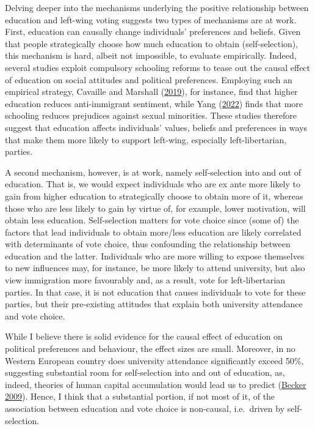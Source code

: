\documentclass[
]{article}
\begin{document}
Delving deeper into the mechanisms underlying the positive relationship
between education and left-wing voting suggests two types of mechanisms
are at work. First, education can causally change individuals'
preferences and beliefs. Given that people strategically choose how much
education to obtain (self-selection), this mechanism is hard, albeit not
impossible, to evaluate empirically. Indeed, several studies exploit
compulsory schooling reforms to tease out the causal effect of education
on social attitudes and political preferences. Employing such an
empirical strategy, Cavaille and Marshall
(\protect\hyperlink{ref-cavaille2019education}{2019}), for instance,
find that higher education reduces anti-immigrant sentiment, while Yang
(\protect\hyperlink{ref-yang2022more}{2022}) finds that more schooling
reduces prejudices against sexual minorities. These studies therefore
suggest that education affects individuals' values, beliefs and
preferences in ways that make them more likely to support left-wing,
especially left-libertarian, parties.

A second mechanism, however, is at work, namely self-selection into and
out of education. That is, we would expect individuals who are ex ante
more likely to gain from higher education to strategically choose to
obtain more of it, whereas those who are less likely to gain by virtue
of, for example, lower motivation, will obtain less education.
Self-selection matters for vote choice since (some of) the factors that
lead individuals to obtain more/less education are likely correlated
with determinants of vote choice, thus confounding the relationship
between education and the latter. Individuals who are more willing to
expose themselves to new influences may, for instance, be more likely to
attend university, but also view immigration more favourably and, as a
result, vote for left-libertarian parties. In that case, it is not
education that causes individuals to vote for these parties, but their
pre-existing attitudes that explain both university attendance and vote
choice.

While I believe there is solid evidence for the causal effect of
education on political preferences and behaviour, the effect sizes are
small. Moreover, in no Western European country does university
attendance significantly exceed 50\%, suggesting substantial room for
self-selection into and out of education, as, indeed, theories of human
capital accumulation would lead us to predict
(\protect\hyperlink{ref-becker2009human}{Becker 2009}). Hence, I think
that a substantial portion, if not most of it, of the association
between education and vote choice is non-causal, i.e.~driven by
self-selection.
\end{document}
